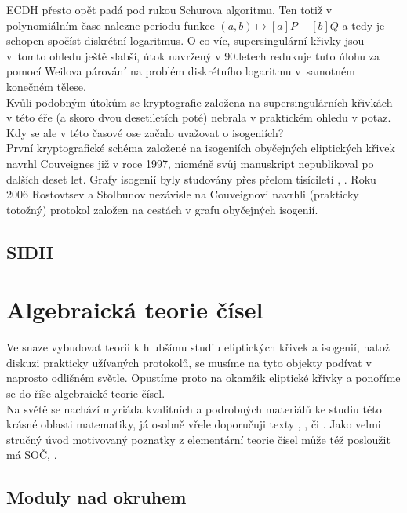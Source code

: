 \documentclass [12pt]{report}
\begin{document}
ECDH přesto opět padá pod rukou Schurova algoritmu. Ten totiž v polynomiálním čase nalezne periodu funkce $(a,b) \mapsto [a]P - [b]Q$ a tedy je schopen spočíst diskrétní logaritmus. O co víc, supersingulární křivky jsou v~tomto ohledu ještě slabší, útok navržený v 90.letech \cite{MOV}  redukuje tuto úlohu za pomocí Weilova párování na problém diskrétního logaritmu v~samotném konečném tělese.\\

Kvůli podobným útokům se kryptografie založena na supersingulárních křivkách v této éře (a skoro dvou desetiletích poté) nebrala v praktickém ohledu v potaz. Kdy se ale v této časové ose začalo uvažovat o isogeniích?\\

První kryptografické schéma založené na isogeniích obyčejných eliptických křivek navrhl Couveignes \cite{Couveignes} již v roce 1997, nicméně svůj manuskript nepublikoval po dalších deset let. Grafy isogenií byly studovány přes přelom tisíciletí \cite{Galbraith}, \cite{Galbraith2}. Roku 2006 Rostovtsev a Stolbunov \cite{Stolbunov} nezávisle na Couveignovi navrhli (prakticky totožný) protokol založen na cestách v grafu obyčejných isogenií.\\


\section{SIDH}




\chapter{Algebraická teorie čísel}

Ve snaze vybudovat teorii k hlubšímu studiu eliptických křivek a isogenií, natož diskuzi prakticky užívaných protokolů, se musíme na tyto objekty podívat v naprosto odlišném světle. Opustíme proto na okamžik eliptické křivky a ponoříme se do říše algebraické teorie čísel.\\

Na světě se nachází myriáda kvalitních a podrobných materiálů ke studiu této krásné oblasti matematiky, já osobně vřele doporučuji texty \cite{Ireland}, \cite{Neukirch}, \cite{Perutka} či \cite{Pupik}. Jako velmi stručný úvod motivovaný poznatky z elementární teorie čísel může též posloužit má SOČ, \cite{Pezlar}. 

\section{Moduly nad okruhem}
\end{document}
